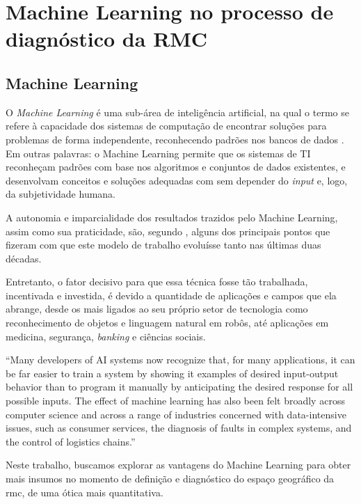 	\section{Machine Learning no processo de diagnóstico da RMC} \label{sec:machine}
	
	\subsection{Machine Learning}
	
	O \textit{Machine Learning} é uma sub-área de inteligência artificial, na qual o termo se refere à capacidade dos sistemas de computação de encontrar soluções para problemas de forma independente, reconhecendo padrões nos bancos de dados \cite{jordan2015a}. Em outras palavras: o Machine Learning permite que os sistemas de TI reconheçam padrões com base nos algoritmos e conjuntos de dados existentes, e desenvolvam conceitos e soluções adequadas com sem depender do \textit{input} e, logo, da subjetividade humana. 
	
	A autonomia e imparcialidade dos resultados trazidos pelo Machine Learning, assim como sua praticidade, são, segundo , alguns dos principais pontos que fizeram com que este modelo de trabalho evoluísse tanto nas últimas duas décadas. 
	
	Entretanto, o fator decisivo para que essa técnica fosse tão trabalhada, incentivada e investida, é devido a quantidade de aplicações e campos que ela abrange, desde os mais ligados ao seu próprio setor de tecnologia como reconhecimento de objetos e linguagem natural em robôs, até aplicações em medicina, segurança, \textit{banking} e ciências sociais.
	
	\begin{citacao}
		``Many developers of AI systems now recognize that, for many applications, it can be far easier to train a system by showing it examples of desired input-output behavior than to program it manually by anticipating the desired response for all possible inputs. The effect of machine learning has also been felt broadly across computer science and across a range of industries concerned with data-intensive issues, such as consumer services, the diagnosis of faults in complex systems, and the control of logistics chains.'' \cite[p. 255]{jordan2015a}
	\end{citacao}

	Neste trabalho, buscamos explorar as vantagens do Machine Learning para obter mais insumos no momento de definição e diagnóstico do espaço geográfico da \glsdesc{rmc}, de uma ótica mais quantitativa.
	
